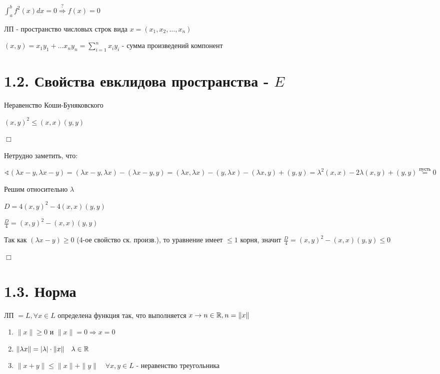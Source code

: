\documentclass[12pt]{article}
\begin{document}
    $\int^b_a f^2(x) dx = 0 \stackrel{?}{\Longrightarrow} f(x) = 0$

     ЛП - пространство числовых строк вида $x = (x_1, x_2, \dots, x_n)$

    $(x, y) = x_1 y_1 + \dots x_n y_n = \sum_{i=1}^n x_i y_i$ - сумма произведений компонент

    \section{1.2. Свойства евклидова пространства - $E$}

    \hypertarget{inequalityofCauchyBunyakovsky}{}

    \Th Неравенство Коши-Буняковского

    $(x, y)^2 \leq (x, x)(y, y)$

    $\Box$

    Нетрудно заметить, что:

    $\sphericalangle (\lambda x - y, \lambda x - y) = (\lambda x - y, \lambda x) - (\lambda x - y, y) =
    (\lambda x, \lambda x) - (y, \lambda x) - (\lambda x, y) + (y, y) = \lambda^2 (x, x) - 2\lambda (x, y) + (y, y) \stackrel{\text{пусть}}{=} 0$

    Решим относительно $\lambda$

    $D = 4(x, y)^2 - 4(x, x)(y, y)$

    $\frac{D}{4} = (x, y)^2 - (x, x)(y, y)$

    Так как $(\lambda x - y) \geq 0$ (4-ое свойство ск. произв.), то уравнение имеет $\leq 1$ корня, значит
    $\frac{D}{4} = (x, y)^2 - (x, x)(y, y) \leq 0$

    $\Box$

    \section{1.3. Норма}

    \hypertarget{normdefinition}{}

    ЛП $= L, \forall x \in L$ определена функция так, что выполняется $x \to n \in \mathbb{R}, n = \|x\|$

    \begin{enumerate}
        \item $\|x\| \geq 0$ и $\|x\| = 0 \Longrightarrow x = 0$
        \item $\|\lambda x\| = |\lambda| \cdot \|x\| \quad \lambda \in \mathbb{R}$
        \item $\|x + y\| \leq \|x\| + \|y\| \quad \forall x, y \in L$ - неравенство треугольника
    \end{enumerate}
\end{document}
